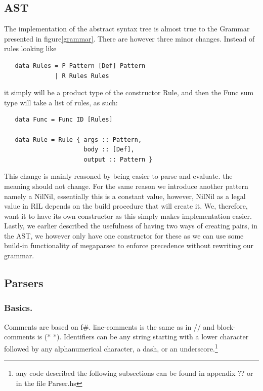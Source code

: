 \documentclass[a4paper]{article}
\begin{document}
\subsection{AST}
\label{sec:orgd664a6e}
The implementation of the abstract syntax tree is almost true to the Grammar presented in figure\ref{grammar}. There are however three minor changes. Instead of rules looking like
\begin{verbatim}
   data Rules = P Pattern [Def] Pattern
              | R Rules Rules
\end{verbatim}
it simply will be a product type of the constructor Rule, and then the Func sum type will take a list of rules, as such:
\begin{verbatim}
   data Func = Func ID [Rules]

   data Rule = Rule { args :: Pattern,
                      body :: [Def],
                      output :: Pattern }
\end{verbatim}
This change is mainly reasoned by being easier to parse and evaluate. the meaning should not change.
For the same reason we introduce another pattern namely a NilNil, essentially this is a constant value, however, NilNil as a legal value in RIL depends on the build procedure that will create it. We, therefore, want it to have its own constructor as this simply makes implementation easier.
Lastly, we earlier described the usefulness of having two ways of creating pairs, in the AST, we however only have one constructor for these as we can use some build-in functionality of megaparsec to enforce precedence without rewriting our grammar.
\subsection{Parsers}
\label{sec:orgb3df1b5}
\subsubsection{Basics.}
\label{sec:org52ae51f}
Comments are based on f\#. line-comments is the same as in // and block-comments is (* *). Identifiers can be any string starting with a lower character followed by any alphanumerical character, a dash, or an underscore.\footnote{any code described the following subsections can be found in appendix ?? or in the file Parser.hs}
\end{document}
